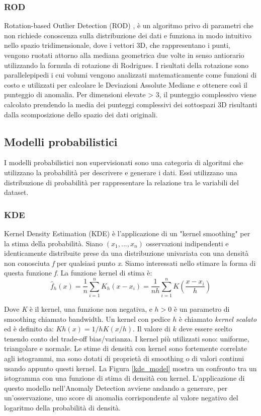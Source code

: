 \subsubsection{ROD}
Rotation-based Outlier Detection (ROD) \cite{almardeny2020novel},  è un algoritmo privo di parametri che non richiede conoscenza sulla distribuzione dei dati e funziona in modo intuitivo nello spazio tridimensionale, dove i vettori 3D, che rappresentano i punti, vengono ruotati attorno alla mediana geometrica due volte in senso antiorario utilizzando la formula di rotazione di Rodrigues. I risultati della rotazione sono parallelepipedi i cui volumi vengono analizzati matematicamente come funzioni di costo e utilizzati per calcolare le Deviazioni Assolute Mediane e ottenere così il punteggio di anomalia. Per dimensioni elevate > 3, il punteggio complessivo viene calcolato prendendo la media dei punteggi complessivi dei sottospazi 3D risultanti dalla scomposizione dello spazio dei dati originali.


\subsection{Modelli probabilistici}
I modelli probabilistici non supervisionati sono una categoria di algoritmi che utilizzano la probabilità per descrivere e generare i dati. Essi utilizzano una distribuzione di probabilità per rappresentare la relazione tra le variabili del dataset.
\subsubsection{KDE}
Kernel Density Estimation (KDE) \cite{latecki2007outlier} è l'applicazione di un "kernel smoothing" per la stima della probabilità. 
Siano $(x_1,...,x_n)$ osservazioni indipendenti e identicamente distribuite prese da una distribuzione univariata con una densità non conosciuta \textit{f} per qualsiasi punto \textit{x}. Siamo interessati nello stimare la forma di questa funzione \textit{f}. La funzione kernel di stima è:
\[\widehat{f}_h(x)=\frac{1}{n} \sum_{i=1}^n K_h\left(x-x_i\right)=\frac{1}{n h} \sum_{i=1}^n K\left(\frac{x-x_i}{h}\right)\]

Dove \textit{K} è il kernel, una funzione non negativa, e $h>0$ è un parametro di smoothing chiamato bandwidth. Un kernel con pedice $h$ è chiamato \textit{kernel scalato} ed è definito da: $Kh(x) = 1/h K(x/h)$. 
Il valore di $k$ deve essere scelto tenendo conto del trade-off bias/varianza.
I kernel più utilizzati sono: uniforme, triangolare e normale.
Le stime di densità con kernel sono fortemente correlate agli istogrammi, ma sono dotati di proprietà di smoothing o di valori continui usando appunto questi kernel.
La Figura \ref{kde_model} mostra un confronto tra un istogramma con una funzione di stima di densità con kernel.
L'applicazione di questo modello nell'Anomaly Detection avviene andando a generare, per un'osservazione, uno score di anomalia corrispondente al valore negativo del logaritmo della probabilità di densità.

